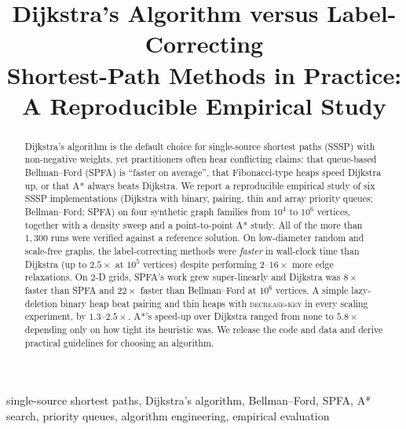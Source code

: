 \documentclass[conference]{IEEEtran}
\begin{document}
\title{Dijkstra's Algorithm versus Label-Correcting\\Shortest-Path Methods in Practice:\\A Reproducible Empirical Study}

\author{
}

\maketitle

\begin{abstract}
Dijkstra's algorithm is the default choice for single-source shortest paths
(SSSP) with non-negative weights, yet practitioners often hear conflicting
claims: that queue-based Bellman--Ford (SPFA) is ``faster on average'', that
Fibonacci-type heaps speed Dijkstra up, or that A* always beats Dijkstra. We
report a reproducible empirical study of six SSSP implementations (Dijkstra with
binary, pairing, thin and array priority queues; Bellman--Ford; SPFA) on four
synthetic graph families from $10^4$ to $10^6$ vertices, together with a density
sweep and a point-to-point A* study. All of the more than $1{,}300$ runs were verified against a
reference solution. On low-diameter random and scale-free graphs, the
label-correcting methods were \emph{faster} in wall-clock time than Dijkstra
(up to $2.5\times$ at $10^5$ vertices) despite performing $2$--$16\times$ more
edge relaxations. On 2-D grids, SPFA's work grew super-linearly and Dijkstra was
$8\times$ faster than SPFA and $22\times$ faster than Bellman--Ford at $10^6$
vertices. A simple lazy-deletion binary heap beat pairing and thin heaps with
\textsc{decrease-key} in every scaling experiment, by $1.3$--$2.5\times$. A*'s
speed-up over Dijkstra ranged from none to $5.8\times$ depending only on how
tight its heuristic was. We release the code and data and derive practical
guidelines for choosing an algorithm.
\end{abstract}

\begin{IEEEkeywords}
single-source shortest paths, Dijkstra's algorithm, Bellman--Ford, SPFA, A* search, priority queues, algorithm engineering, empirical evaluation
\end{IEEEkeywords}
\end{document}
